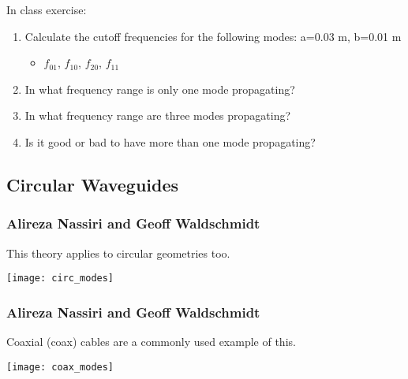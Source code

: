 \documentclass[professionalfonts,t]{beamer}
\begin{document}
{\begin{frame}
	In class exercise:
	\begin{enumerate}
		\item Calculate the cutoff frequencies for the following modes: a=0.03 m, b=0.01 m
		\begin{itemize}
			\item $f_{01}$, $f_{10}$, $f_{20}$, $f_{11}$
		\end{itemize}
		\item In what frequency range is only one mode propagating?
		\item In what frequency range are three modes propagating?
		\item Is it good or bad to have more than one mode propagating?
	\end{enumerate}	
\end{frame}


\subsection{Circular Waveguides}
\begin{frame}
\frametitle{Alireza Nassiri and Geoff Waldschmidt}
This theory applies to circular geometries too.

\centering
	\texttt{[image: circ\_modes]}
	\vspace{-1em}
\end{frame}
\begin{frame}
\frametitle{Alireza Nassiri and Geoff Waldschmidt}
Coaxial (coax) cables are a commonly used example of this.

\centering
	\texttt{[image: coax\_modes]}
	\vspace{-1em}
\end{frame}

}

\fi


\iftrue
\end{document}
